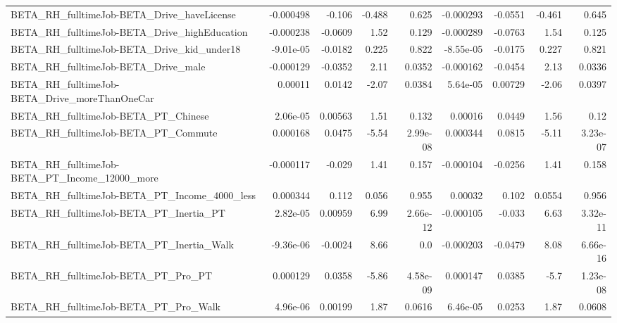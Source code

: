 \begin{tabular}{lrrrrrrrr}
BETA\_RH\_fulltimeJob-BETA\_Drive\_haveLicense         &   -0.000498 &       -0.106 &   -0.488 &    0.625 &  -0.000293 &     -0.0551 &       -0.461 &         0.645 \\
BETA\_RH\_fulltimeJob-BETA\_Drive\_highEducation       &   -0.000238 &      -0.0609 &     1.52 &    0.129 &  -0.000289 &     -0.0763 &         1.54 &         0.125 \\
BETA\_RH\_fulltimeJob-BETA\_Drive\_kid\_under18         &   -9.01e-05 &      -0.0182 &    0.225 &    0.822 &  -8.55e-05 &     -0.0175 &        0.227 &         0.821 \\
BETA\_RH\_fulltimeJob-BETA\_Drive\_male                &   -0.000129 &      -0.0352 &     2.11 &   0.0352 &  -0.000162 &     -0.0454 &         2.13 &        0.0336 \\
BETA\_RH\_fulltimeJob-BETA\_Drive\_moreThanOneCar      &     0.00011 &       0.0142 &    -2.07 &   0.0384 &   5.64e-05 &     0.00729 &        -2.06 &        0.0397 \\
BETA\_RH\_fulltimeJob-BETA\_PT\_Chinese                &    2.06e-05 &      0.00563 &     1.51 &    0.132 &    0.00016 &      0.0449 &         1.56 &          0.12 \\
BETA\_RH\_fulltimeJob-BETA\_PT\_Commute                &    0.000168 &       0.0475 &    -5.54 & 2.99e-08 &   0.000344 &      0.0815 &        -5.11 &      3.23e-07 \\
BETA\_RH\_fulltimeJob-BETA\_PT\_Income\_12000\_more      &   -0.000117 &       -0.029 &     1.41 &    0.157 &  -0.000104 &     -0.0256 &         1.41 &         0.158 \\
BETA\_RH\_fulltimeJob-BETA\_PT\_Income\_4000\_less       &    0.000344 &        0.112 &    0.056 &    0.955 &    0.00032 &       0.102 &       0.0554 &         0.956 \\
BETA\_RH\_fulltimeJob-BETA\_PT\_Inertia\_PT             &    2.82e-05 &      0.00959 &     6.99 & 2.66e-12 &  -0.000105 &      -0.033 &         6.63 &      3.32e-11 \\
BETA\_RH\_fulltimeJob-BETA\_PT\_Inertia\_Walk           &   -9.36e-06 &      -0.0024 &     8.66 &      0.0 &  -0.000203 &     -0.0479 &         8.08 &      6.66e-16 \\
BETA\_RH\_fulltimeJob-BETA\_PT\_Pro\_PT                 &    0.000129 &       0.0358 &    -5.86 & 4.58e-09 &   0.000147 &      0.0385 &         -5.7 &      1.23e-08 \\
BETA\_RH\_fulltimeJob-BETA\_PT\_Pro\_Walk               &    4.96e-06 &      0.00199 &     1.87 &   0.0616 &   6.46e-05 &      0.0253 &         1.87 &        0.0608 \\

\end{tabular}
